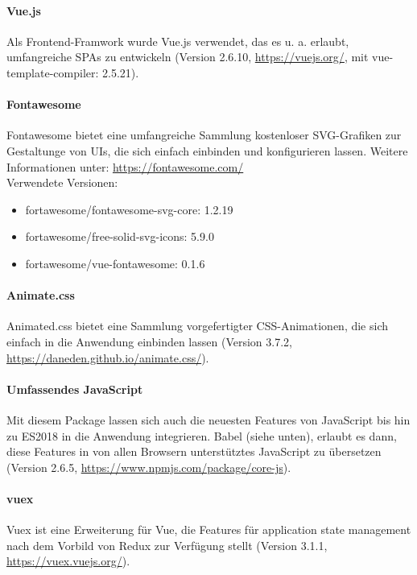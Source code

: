 	\paragraph{Vue.js}
	Als Frontend-Framwork wurde Vue.js verwendet, das es u. a. erlaubt, umfangreiche SPAs zu entwickeln (Version 2.6.10, \url{https://vuejs.org/}, mit vue-template-compiler: 2.5.21).
	
	\paragraph{Fontawesome}
	Fontawesome bietet eine umfangreiche Sammlung kostenloser SVG-Grafiken zur Gestaltunge von UIs, die sich einfach einbinden und konfigurieren lassen. Weitere Informationen unter: \url{https://fontawesome.com/}\\
	Verwendete Versionen:
	\begin{itemize}
		\item fortawesome/fontawesome-svg-core: 1.2.19
		\item fortawesome/free-solid-svg-icons: 5.9.0
		\item fortawesome/vue-fontawesome: 0.1.6
	\end{itemize}

	\paragraph{Animate.css}
	Animated.css bietet eine Sammlung vorgefertigter CSS-Animationen, die sich einfach in die Anwendung einbinden lassen (Version 3.7.2, \url{https://daneden.github.io/animate.css/}).

	\paragraph{Umfassendes JavaScript}
	Mit diesem Package lassen sich auch die neuesten Features von JavaScript bis hin zu ES2018 in die Anwendung integrieren. Babel (siehe unten), erlaubt es dann, diese Features in von allen Browsern unterstütztes JavaScript zu übersetzen (Version 2.6.5, \url{https://www.npmjs.com/package/core-js}).

	\paragraph{vuex}
	Vuex ist eine Erweiterung für Vue, die Features für application state management nach dem Vorbild von Redux zur Verfügung stellt (Version 3.1.1, \url{https://vuex.vuejs.org/}).

